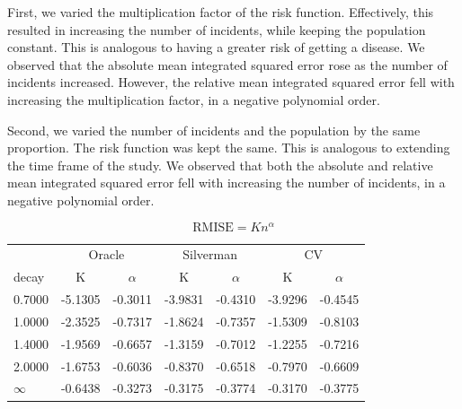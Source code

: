 First, we varied the multiplication factor of the risk function.
Effectively, this resulted in increasing the number of incidents, while keeping the population constant.
This is analogous to having a greater risk of getting a disease.
We observed that the absolute mean integrated squared error rose as the number of incidents increased.
However, the relative mean integrated squared error fell with increasing the multiplication factor, in a negative polynomial order.

Second, we varied the number of incidents and the population by the same proportion.
The risk function was kept the same.
This is analogous to extending the time frame of the study.
We observed that both the absolute and relative mean integrated squared error fell with increasing the number of incidents, in a negative polynomial order.

\[
    \mbox{RMISE} = K n^{\alpha}
\]


\begin{table}[htbp]
\begin{tabular}{l*6c}
  \hline
  & \multicolumn{2}{c}{Oracle} & \multicolumn{2}{c}{Silverman} & \multicolumn{2}{c}{CV} \\ 
  decay & K & \( \alpha \) & K & \( \alpha \) & K & \( \alpha \) \\ 
  \hline
  0.7000 & -5.1305 & -0.3011 & -3.9831 & -0.4310 & -3.9296 & -0.4545 \\ 
  1.0000 & -2.3525 & -0.7317 & -1.8624 & -0.7357 & -1.5309 & -0.8103 \\ 
  1.4000 & -1.9569 & -0.6657 & -1.3159 & -0.7012 & -1.2255 & -0.7216 \\ 
  2.0000 & -1.6753 & -0.6036 & -0.8370 & -0.6518 & -0.7970 & -0.6609 \\ 
  \( \infty \) & -0.6438 & -0.3273 & -0.3175 & -0.3774 & -0.3170 & -0.3775 \\ 
  \hline
\end{tabular}
\end{table}

\graphicspath{{./}}
